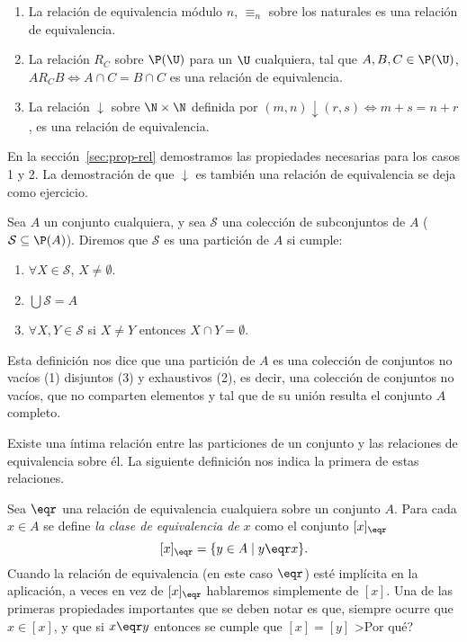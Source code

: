 \begin{ejemplo}
\begin{enumerate}
  \itemsep 0pt
  \item La relación de equivalencia módulo $n$, $\equiv_n$ sobre los naturales es una relación de equivalencia.
  \item La relación $R_C$ sobre $\P(\U)$ para un $\U$ cualquiera, tal que $A,B,C\in\P(\U)$, $A R_CB\Leftrightarrow A\cap C= B\cap C$ es una relación de equivalencia.
  \item La relación $\downarrow$ sobre $\N\times\N$ definida por $(m,n)\downarrow(r,s)\Leftrightarrow m+s=n+r$, es una relación de equivalencia.

\end{enumerate}
En la sección~\ref{sec:prop-rel} demostramos las propiedades necesarias para los casos 1 y 2.
La demostración de que $\downarrow$ es también una relación de equivalencia se deja como ejercicio.
\end{ejemplo}

\begin{definicion}
Sea $A$ un conjunto cualquiera, y sea $\mathcal S$ una colección de subconjuntos de $A$ ($\mathcal S\subseteq\P(A)$).
Diremos que $\mathcal S$ es una partición de $A$ si cumple:
\begin{enumerate}
  \itemsep 0pt
  \item $\forall X\in\mathcal S$, $X\not=\emptyset$.
  \item $\bigcup\mathcal S=A$
  \item $\forall X,Y\in\mathcal S$ si $X\not=Y$ entonces $X\cap Y=\emptyset$.
\end{enumerate}
Esta definición nos dice que una partición de $A$ es una colección de conjuntos no vacíos (1) disjuntos (3) y exhaustivos (2), es decir, una colección de conjuntos no vacíos, que no comparten elementos y tal que de su unión resulta el conjunto $A$ completo.
\end{definicion}

Existe una íntima relación entre las particiones de un conjunto y las relaciones de equivalencia sobre él.
La siguiente definición nos indica la primera de estas relaciones.

\begin{definicion}
Sea $\eqr$ una relación de equivalencia cualquiera sobre un conjunto $A$.
Para cada $x\in A$ se define \emph{la clase de equivalencia de} $x$ como el conjunto $[x]_\eqr$
\[
[x]_\eqr=\{y\in A\;|\; y\eqr x\}.
\]
Cuando la relación de equivalencia (en este caso $\eqr$) esté implícita en la aplicación, a veces en vez de $[x]_\eqr$ hablaremos simplemente de $[x]$.
Una de las primeras propiedades importantes que se deben notar es que, siempre ocurre que $x\in[x]$, y que si $x\eqr y$ entonces se cumple que $[x]=[y]$ >Por qué?
\end{definicion}

